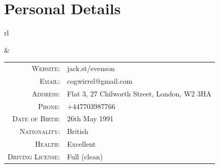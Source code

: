 \section*{Personal Details}

\begin{tabular}{rl}


&

\begin{tabular}{rl}
\textsc{Website:} & jack.st/evenson \\
\textsc{Email:} & cogwirrel@gmail.com \\
\textsc{Address:} & Flat 3, 27 Chilworth Street, London, W2 3HA\\
\textsc{Phone:} & +447703987766\\
\textsc{Date of Birth:} & 26th May 1991 \\
\textsc{Nationality:} & British \\
\textsc{Health:} & Excellent \\
\textsc{Driving License:} & Full (clean)
\end{tabular}

\end{tabular}